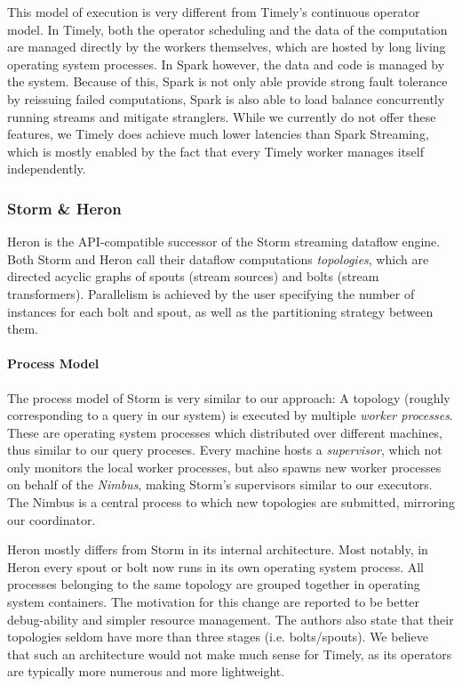 This model of execution is very different from Timely's continuous operator
model. In Timely, both the operator scheduling and the data of the
computation are managed directly by the workers themselves, which are hosted
by long living operating system processes. In Spark however, the data and code
is managed by the system. Because of this, Spark is not only able provide strong
fault tolerance by reissuing failed computations, Spark is also able to load
balance concurrently running streams and mitigate stranglers. While we currently
do not offer these features, we Timely does achieve much lower latencies than
Spark Streaming, which is mostly enabled by the fact that every Timely
worker manages itself independently.


\subsubsection{Storm \& Heron}

Heron \cite{heron} is the API-compatible successor of the Storm \cite{storm}
streaming dataflow engine.
Both Storm and Heron call their dataflow computations \emph{topologies}, which 
are directed acyclic graphs of spouts (stream sources) and bolts
(stream transformers). Parallelism is achieved by the user specifying the
number of instances for each bolt and spout, as well as the partitioning
strategy between them.

\paragraph{Process Model}

The process model of Storm is very similar to our approach: A topology
(roughly corresponding to a query in our system) is executed by multiple
\emph{worker processes}. These are operating system processes which distributed
over different machines, thus similar to our query proceses. Every machine hosts
a \emph{supervisor}, which not only monitors the local worker processes, but also spawns new worker
processes on behalf of the \emph{Nimbus}, making Storm's supervisors similar to our executors.
The Nimbus is a central process to which new topologies are submitted, mirroring our coordinator.

Heron mostly differs from Storm in its internal architecture. Most notably, in
Heron every spout or bolt now runs in its own operating system process. All processes
belonging to the same topology are grouped together in operating system containers.
The motivation for this change are reported to be better debug-ability
and simpler resource management. The authors also state that their topologies
seldom have more than three stages (i.e. bolts/spouts). We believe that such
an architecture would not make much sense for Timely, as its operators are typically
more numerous and more lightweight.

